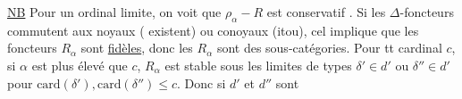 \uline{NB} Pour un ordinal limite, on voit que $\rho_\alpha\mathbin{-}R$ est conservatif . Si les $\Delta$-foncteurs   commutent aux noyaux (   existent) ou conoyaux (itou), cel implique que les foncteurs $R_\alpha$ sont  \uline{fidèles}, donc les $R_\alpha$ sont des sous-catégories. Pour tt cardinal $c$, si $\alpha$ est plus élevé que $c$, $R_\alpha$ est stable sous les limites de types $\delta'\in d'$ ou $\delta''\in d'$ pour $\mathrm{card}(\delta'),\mathrm{card}(\delta'')\leq c$. Donc si $d'$ et $d''$ sont 
